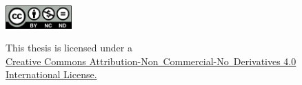 \documentclass[online]{dstu3008/dstu3008}
\title{\thesisTitle}
\author{\thesisAuthor}
\newcommand{\osh}{}
\newcommand{\osh}{}
\begin{document}

\setcounter{page}{4}

\newpage
\begin{center}
\leavevmode
\includegraphics[width=1in]{images/cc-by-nc-nd.png}
\label{fig:cc}
\end{center}
\begin{center}
This thesis is licensed under a \\
\href{http://creativecommons.org/licenses/by-nc-nd/3.0/}
{Creative Commons Attribution-Non~Commercial-No~Derivatives 4.0 International License.}
\end{center}
\newpage



\tableofcontents





\osh




\end{document}
